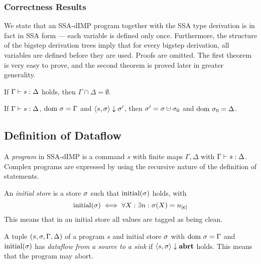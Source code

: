 \subsubsection*{Correctness Results}
We state that an SSA-dIMP program together with the SSA type derivation
is in fact in SSA form --- each variable is defined only once.
Furthermore, the structure of the bigstep derivation trees imply that 
for every bigstep derivation, all variables are defined before they are used.
Proofs are omitted.
The first theorem is very easy to prove, and the second theorem is proved later in greater generality.

\begin{theorem}
    \label{thm:ssa-gamma-delta-disjoint}
    If $\Gamma \vdash {s}: \Delta$ holds, then $\Gamma \cap \Delta = \emptyset$.
\end{theorem}

\begin{theorem}
    \label{thm:ssa-progress}
    If $\Gamma \vdash {s}: \Delta$, $\text{dom }{\sigma} = \Gamma$ and
    $\langle s, \sigma \rangle \downarrow \sigma'$, then $\store' = \store \dunion \store_0$
    and $\text{dom }{\sigma_0} = \Delta$.
\end{theorem}

\subsection{Definition of Dataflow}
\begin{definition}[Program]
    A \emph{program} in SSA-dIMP is a command $s$ with finite maps $\Gamma, \Delta$ 
    with $\Gamma \vdash {s}: \Delta$.
    Complex programs are expressed by using the recursive nature of the definition of statements.
\end{definition}

\begin{definition}
    An \emph{initial store} is a store $\sigma$ such that $\text{initial}({\sigma}){}$ holds, with 
    \begin{equation*}
        \initialstore{} \iff \forall X: \exists n: \store(X) = \clean[n]
    \end{equation*}
    This means that in an initial store all values are tagged as being clean.
\end{definition}

\begin{definition}[Dataflow]
    A tuple $(s, \sigma, \Gamma, \Delta)$ of a program $s$ and initial store $\sigma{}$ 
    with $\text{dom }{\sigma{}} = \Gamma$ and $\text{initial}({\sigma})$ 
    has \emph{dataflow from a source to a sink} if
    $\langle s, \sigma{} \rangle \downarrow \textbf{abrt}$ holds.
    This means that the program may abort.
\end{definition}

